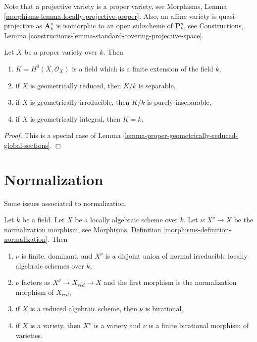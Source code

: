 \noindent
Note that a projective variety is a proper variety, see
Morphisms, Lemma \ref{morphisms-lemma-locally-projective-proper}.
Also, an affine variety is quasi-projective as $\mathbf{A}^n_k$
is isomorphic to an open subscheme of $\mathbf{P}^n_k$, see
Constructions,
Lemma \ref{constructions-lemma-standard-covering-projective-space}.

\begin{lemma}
\label{lemma-regular-functions-proper-variety}
Let $X$ be a proper variety over $k$. Then
\begin{enumerate}
\item $K = H^0(X, \mathcal{O}_X)$ is a field which is
a finite extension of the field $k$,
\item if $X$ is geometrically reduced, then $K/k$ is separable,
\item if $X$ is geometrically irreducible, then $K/k$
is purely inseparable,
\item if $X$ is geometrically integral, then $K = k$.
\end{enumerate}
\end{lemma}

\begin{proof}
This is a special case of
Lemma \ref{lemma-proper-geometrically-reduced-global-sections}.
\end{proof}




\section{Normalization}
\label{section-normalization}

\noindent
Some issues associated to normalization.

\begin{lemma}
\label{lemma-normalization-locally-algebraic}
Let $k$ be a field. Let $X$ be a locally algebraic scheme over $k$.
Let $\nu : X^\nu \to X$ be the normalization morphism, see
Morphisms, Definition \ref{morphisms-definition-normalization}.
Then
\begin{enumerate}
\item $\nu$ is finite, dominant, and $X^\nu$ is a disjoint
union of normal irreducible locally algebraic schemes over $k$,
\item $\nu$ factors as $X^\nu \to X_{red} \to X$ and the first
morphism is the normalization morphism of $X_{red}$,
\item if $X$ is a reduced algebraic scheme, then $\nu$ is
birational,
\item if $X$ is a variety, then $X^\nu$ is a variety and
$\nu$ is a finite birational morphism of varieties.
\end{enumerate}
\end{lemma}

